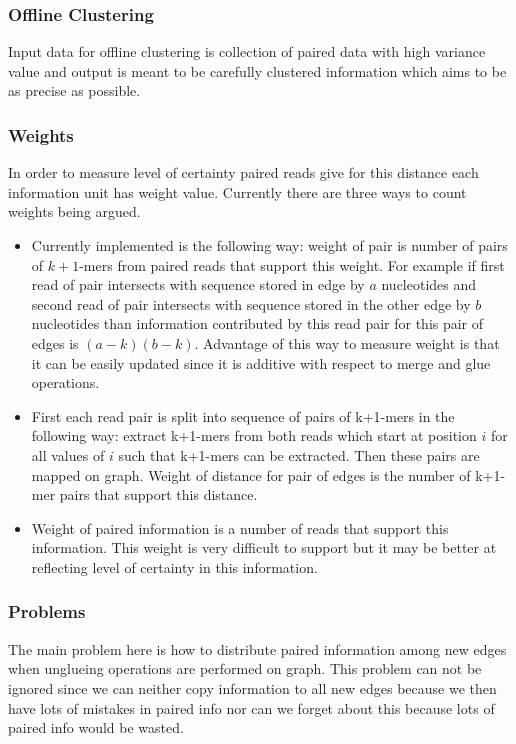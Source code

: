 \documentclass[12pt]{article}
\begin{document}
\subsubsection{Offline Clustering}

Input data for offline clustering is collection of paired data with high variance value and output is meant to be carefully clustered information which aims to be as precise as possible.

\subsubsection{Weights}
In order to measure level of certainty paired reads give for this distance each information unit has weight value. Currently there are three ways to count weights being argued.

\begin{itemize}
\item Currently implemented is the following way: weight of pair is number of pairs of $k+1$-mers from paired reads that support this weight. For example if first read of pair intersects with sequence stored in edge by $a$ nucleotides and second read of pair intersects with sequence stored in the other edge by $b$ nucleotides than information contributed by this read pair for this pair of edges is $(a - k)(b - k)$. Advantage of this way to measure weight is that it can be easily updated since it is additive with respect to merge and glue operations.
\item First each read pair is split into sequence of pairs of k+1-mers in the following way: extract k+1-mers from both reads which start at position $i$ for all values of $i$ such that k+1-mers can be extracted. Then these pairs are mapped on graph. Weight of distance for pair of edges is the number of k+1-mer pairs that support this distance.
\item Weight of paired information is a number of reads that support this information. This weight is very difficult to support but it may be better at reflecting level of certainty in this information.
\end{itemize}

\subsubsection{Problems}

The main problem here is how to distribute paired information among new edges when unglueing operations are performed on graph. This problem can not be ignored since we can neither copy information to all new edges because we then have lots of mistakes in paired info nor can we forget about this because lots of paired info would be wasted.
\end{document}
